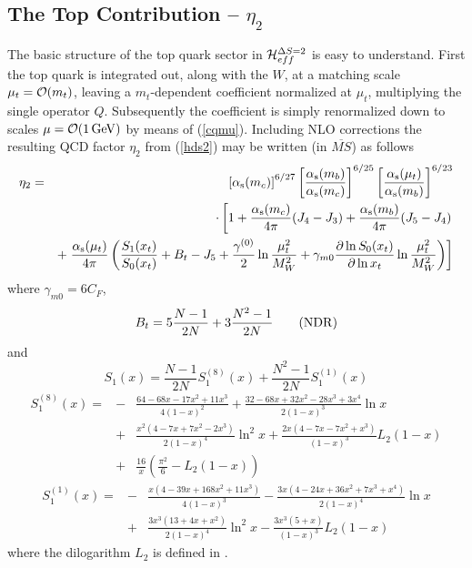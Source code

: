 \subsection{The Top Contribution -- $\eta_2$}
\label{sec:HeffKKbar:eta2}

The basic structure of the top quark sector in
${\cal H}^{\Delta S=2}_{eff}$ is easy to understand. First the
top quark is integrated out, along with the $W$, at a matching
scale $\mu_t={\cal O}(m_t)$, leaving a $m_t$-dependent coefficient
normalized at $\mu_t$, multiplying the single operator $Q$.
Subsequently the coefficient is simply renormalized down to
scales $\mu={\cal O}(1\, {\rm GeV})$ by means of (\ref{cqmu}). Including
NLO corrections the resulting QCD factor $\eta_2$ from (\ref{hds2})
may be written (in $\overline{MS}$) as follows \cite{burasjaminweisz:90}
\begin{eqnarray}\label{eta2}
\eta_2&=&\left[\alpha_{\rm s}(m_c)\right]^{6/27}
 \left[\frac{\alpha_{\rm s}(m_b)}{\alpha_{\rm s}(m_c)}\right]^{6/25}
 \left[\frac{\alpha_{\rm s}(\mu_t)}{\alpha_{\rm s}(m_b)}\right]^{6/23}
\\
& & \cdot\left[1+\frac{\alpha_{\rm s}(m_c)}{4\pi}(J_4-J_3)+
         \frac{\alpha_{\rm s}(m_b)}{4\pi}(J_5-J_4) \right.
\nonumber\\
& & + \left.\frac{\alpha_{\rm s}(\mu_t)}{4\pi} \left(
 \frac{S_1(x_t)}{S_0(x_t)}+B_t-J_5+\frac{\gamma^{(0)}}{2}
 \ln\frac{\mu^2_t}{M^2_W}+\gamma_{m0}
 \frac{\partial\ln S_0(x_t)}{\partial\ln x_t}\ln\frac{\mu^2_t}{M^2_W}
\right)\right] \nonumber
\end{eqnarray}
where $\gamma_{m0} = 6 C_F$,
\begin{equation}\label{btndr}
B_t=5\frac{N-1}{2N}+3\frac{N^2-1}{2N}\qquad ({\rm NDR})
\end{equation}
and
\begin{equation}\label{s1x}
S_1(x)=\frac{N-1}{2N}S^{(8)}_1(x)+\frac{N^2-1}{2N}S^{(1)}_1(x)
\end{equation}
\begin{eqnarray}\label{s1x8}
S^{(8)}_1(x)=&-&\frac{64-68x-17x^2+11x^3}{4(1-x)^2}+
                \frac{32-68x+32x^2-28x^3+3x^4}{2(1-x)^3}\ln x
\nonumber\\
&+&\frac{x^2(4-7x+7x^2-2x^3)}{2(1-x)^4}\ln^2 x+
   \frac{2x(4-7x-7x^2+x^3)}{(1-x)^3}L_2(1-x)
\nonumber\\
&+&\frac{16}{x}\left(\frac{\pi^2}{6}-L_2(1-x)\right)
\end{eqnarray}
\begin{eqnarray}\label{s1x1}
S^{(1)}_1(x)=&-&\frac{x(4-39x+168x^2+11x^3)}{4(1-x)^3}-
                \frac{3x(4-24x+36x^2+7x^3+x^4)}{2(1-x)^4}\ln x
\nonumber\\
&+&\frac{3x^3(13+4x+x^2)}{2(1-x)^4}\ln^2 x-
   \frac{3x^3(5+x)}{(1-x)^3}L_2(1-x)
\end{eqnarray}
where the dilogarithm $L_2$ is defined in .

